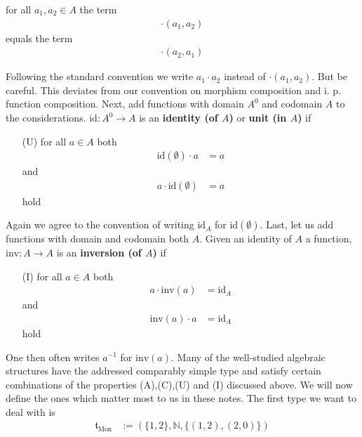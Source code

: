 \begin{exa}
\begin{enumerate}
for all $a_{1},a_{2} \in A$ the term
\begin{align*}
  \cdot(a_{1},a_{2})
\end{align*}
equals the term
\begin{align*}
  \cdot(a_{2},a_{1})
\end{align*}
\end{enumerate}
Following the standard convention we write $a_{1} \cdot a_{2}$ instead of $\cdot(a_{1},a_{2})$. But be careful. This deviates from our convention on morphism composition and i. p. function composition. Next, add functions with domain $A^{0}$ and codomain $A$ to the considerations. $\mathrm{id} \colon A^{0} \rightarrow A$ is an \textbf{identity (of $A$)} or \textbf{unit (in $A$)} if
\begin{enumerate}
\item[(U)]
for all $a \in A$ both
\begin{align*}
  \mathrm{id}(\emptyset)
  \cdot
  a
  &=
  a
\end{align*}
and
\begin{align*}
  a
  \cdot
  \mathrm{id}(\emptyset)
  &=
  a
\end{align*}
hold
\end{enumerate}
Again we agree to the convention of writing $\mathrm{id}_{A}$ for $\mathrm{id}(\emptyset)$. Last, let us add functions with domain and codomain both $A$. Given an identity of $A$ a function, $\mathrm{inv} \colon A \rightarrow A$ is an \textbf{inversion (of $A$)} if
\begin{enumerate}
\item[(I)]
for all $a \in A$  both
\begin{align*}
  a
  \cdot
  \mathrm{inv}(a)
  &=
  \mathrm{id}_{A}
\end{align*}
and
\begin{align*}
  \mathrm{inv}(a)
  \cdot
  a
  &=
  \mathrm{id}_{A}
\end{align*}
hold
\end{enumerate}
One then often writes $a^{-1}$ for $\mathrm{inv}(a)$. Many of the well-studied algebraic structures have the addressed comparably simple type and satisfy certain combinations of the properties (A),(C),(U) and (I) discussed above. We will now define the ones which matter most to us in these notes. The first type we want to deal with is
\begin{align*}
  \mathfrak{t}_{\textrm{Mon}}
  &:=
  \left(
    \lbrace
      1,
      2
    \rbrace,
    \mathbb{N},
    \lbrace
      (1,2),
      (2,0)
    \rbrace
  \right)
\end{align*}

\end{exa}
